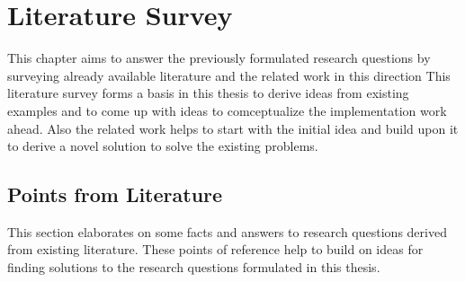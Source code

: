 \chapter{Literature Survey}\label{chapter:LiteratureSurvey}

This chapter aims to answer the previously formulated research questions by surveying already available literature and the related work in this direction This literature survey forms a basis in this thesis to derive ideas from existing examples and to come up with ideas to comceptualize the implementation work ahead. Also the related work helps to start with the initial idea and build upon it to derive a novel solution to solve the existing problems.

\section{Points from Literature} 
\indent This section elaborates on some facts and answers to research questions derived from existing literature. These points of reference help to build on ideas for finding solutions to the research questions formulated in this thesis.
